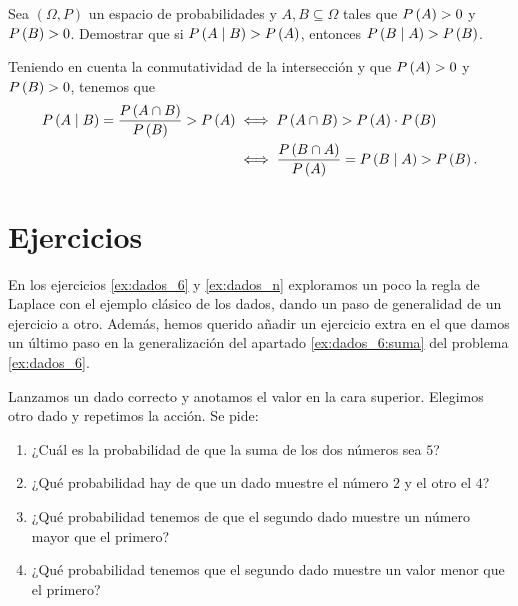 \begin{exercise*}
  Sea $(\Omega, P)$ un espacio de probabilidades y $A, B \subseteq \Omega$
  tales que $P\left(A\right) > 0$ y $P\left(B\right) > 0$. Demostrar que si $P\left(A
  \mid B\right) > P\left(A\right)$, entonces $P\left(B \mid A\right) > P\left(B\right)$. 
\end{exercise*}

\begin{cproof}
  Teniendo en cuenta la conmutatividad de la intersección y que $P\left(A\right) >
  0$ y $P\left(B\right) > 0$, tenemos que
  \[
    \begin{split}
      P\left(A \mid B\right) = \frac{P\left(A \cap B\right)}{P\left(B\right)} > P\left(A\right) &\iff
      P\left(A \cap B\right) > P\left(A\right) \cdot P\left(B\right) \\
      &\iff \frac{P\left(B \cap A\right)}{P\left(A\right)} = P\left(B \mid A\right) > P\left(B\right).
    \end{split}
  \]
\end{cproof}

\section{Ejercicios}

En los ejercicios \ref{ex:dados_6} y \ref{ex:dados_n} exploramos un poco la regla de Laplace con el ejemplo clásico de los dados, dando un paso de generalidad de un ejercicio a otro. Además, hemos querido añadir un ejercicio extra en el que damos un último paso en la generalización del apartado \ref{ex:dados_6:suma} del problema \ref{ex:dados_6}.

\setcounter{problem}{1}

\begin{exercise} \label{ex:dados_6}
  Lanzamos un dado correcto y anotamos el valor en la cara superior. Elegimos otro dado y repetimos la acción. Se pide:
  \begin{enumerate}
    \item ¿Cuál es la probabilidad de que la suma de los dos números sea $5$? \label{ex:dados_6:suma}
    \item ¿Qué probabilidad hay de que un dado muestre el número $2$ y el otro el $4$?
    \item ¿Qué probabilidad tenemos de que el segundo dado muestre un número mayor que el primero?
    \item ¿Qué probabilidad tenemos que el segundo dado muestre un valor menor que el primero?
  \end{enumerate}
\end{exercise}

